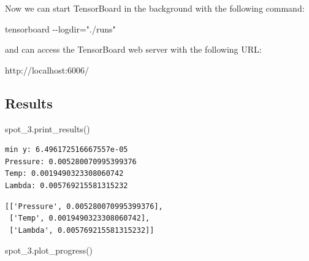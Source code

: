 \documentclass[
  letterpaper,
  DIV=11,
  numbers=noendperiod]{scrreprt}
\newenvironment{Shaded}{\begin{snugshade}}{\end{snugshade}}
\newcommand{\NormalTok}[1]{\textcolor[rgb]{0.00,0.23,0.31}{#1}}
\begin{document}
\begin{tcolorbox}[enhanced jigsaw, left=2mm, opacitybacktitle=0.6, leftrule=.75mm, toptitle=1mm, opacityback=0, colback=white, rightrule=.15mm, colframe=quarto-callout-note-color-frame, title=\textcolor{quarto-callout-note-color}{\faInfo}\hspace{0.5em}{Note}, toprule=.15mm, coltitle=black, bottomrule=.15mm, bottomtitle=1mm, colbacktitle=quarto-callout-note-color!10!white, titlerule=0mm, breakable, arc=.35mm]

Now we can start TensorBoard in the background with the following
command:

\begin{Shaded}
\begin{Highlighting}[]
\NormalTok{tensorboard {-}{-}logdir="./runs"}
\end{Highlighting}
\end{Shaded}

and can access the TensorBoard web server with the following URL:

\begin{Shaded}
\begin{Highlighting}[]
\NormalTok{http://localhost:6006/}
\end{Highlighting}
\end{Shaded}

\end{tcolorbox}

\subsection{Results}\label{results}

\begin{Shaded}
\begin{Highlighting}[]
\NormalTok{spot\_3.print\_results()}
\end{Highlighting}
\end{Shaded}

\begin{verbatim}
min y: 6.496172516667557e-05
Pressure: 0.005280070995399376
Temp: 0.0019490323308060742
Lambda: 0.005769215581315232
\end{verbatim}

\begin{verbatim}
[['Pressure', 0.005280070995399376],
 ['Temp', 0.0019490323308060742],
 ['Lambda', 0.005769215581315232]]
\end{verbatim}

\begin{Shaded}
\begin{Highlighting}[]
\NormalTok{spot\_3.plot\_progress()}
\end{Highlighting}
\end{Shaded}
\end{document}

